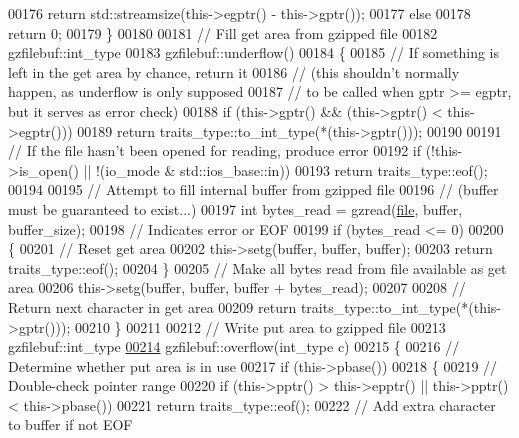 \begin{DoxyCode}
{00176     \textcolor{keywordflow}{return} std::streamsize(this->egptr() - this->gptr());
00177   \textcolor{keywordflow}{else}
00178     \textcolor{keywordflow}{return} 0;
00179 \}
00180 
00181 \textcolor{comment}{// Fill get area from gzipped file}
00182 gzfilebuf::int\_type
00183 gzfilebuf::underflow()
00184 \{
00185   \textcolor{comment}{// If something is left in the get area by chance, return it}
00186   \textcolor{comment}{// (this shouldn't normally happen, as underflow is only supposed}
00187   \textcolor{comment}{// to be called when gptr >= egptr, but it serves as error check)}
00188   \textcolor{keywordflow}{if} (this->gptr() && (this->gptr() < this->egptr()))
00189     \textcolor{keywordflow}{return} traits\_type::to\_int\_type(*(this->gptr()));
00190 
00191   \textcolor{comment}{// If the file hasn't been opened for reading, produce error}
00192   \textcolor{keywordflow}{if} (!this->is\_open() || !(io\_mode & std::ios\_base::in))
00193     \textcolor{keywordflow}{return} traits\_type::eof();
00194 
00195   \textcolor{comment}{// Attempt to fill internal buffer from gzipped file}
00196   \textcolor{comment}{// (buffer must be guaranteed to exist...)}
00197   \textcolor{keywordtype}{int} bytes\_read = gzread(\hyperlink{structfile}{file}, buffer, buffer\_size);
00198   \textcolor{comment}{// Indicates error or EOF}
00199   \textcolor{keywordflow}{if} (bytes\_read <= 0)
00200   \{
00201     \textcolor{comment}{// Reset get area}
00202     this->setg(buffer, buffer, buffer);
00203     \textcolor{keywordflow}{return} traits\_type::eof();
00204   \}
00205   \textcolor{comment}{// Make all bytes read from file available as get area}
00206   this->setg(buffer, buffer, buffer + bytes\_read);
00207 
00208   \textcolor{comment}{// Return next character in get area}
00209   \textcolor{keywordflow}{return} traits\_type::to\_int\_type(*(this->gptr()));
00210 \}
00211 
00212 \textcolor{comment}{// Write put area to gzipped file}
00213 gzfilebuf::int\_type
\hyperlink{classgzfilebuf_a425a4b0d1890abff8f83d7a5aae344b4}{00214} gzfilebuf::overflow(int\_type c)
00215 \{
00216   \textcolor{comment}{// Determine whether put area is in use}
00217   \textcolor{keywordflow}{if} (this->pbase())
00218   \{
00219     \textcolor{comment}{// Double-check pointer range}
00220     \textcolor{keywordflow}{if} (this->pptr() > this->epptr() || this->pptr() < this->pbase())
00221       \textcolor{keywordflow}{return} traits\_type::eof();
00222     \textcolor{comment}{// Add extra character to buffer if not EOF}
}
\end{DoxyCode}

